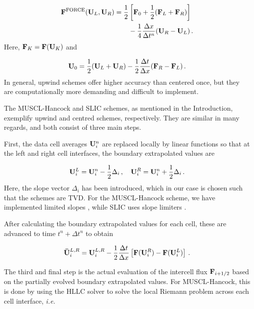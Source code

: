 \documentclass[final,3p,twocolumn]{elsarticle}
\begin{document}
\begin{align} 
    \nonumber 
    {\bf F}^{\rm FORCE}({\bf U}_L,{\bf U}_R) = \frac{1}{2}
    &\left[ {\bf F}_0 + \frac{1}{2} ({\bf F}_L + {\bf F}_{R})
    \right] \\
    \label{eq:FORCE} 
    &- \frac{1}{4} \frac{\Delta x}{\Delta t^n} ({\bf U}_{R} - {\bf
    U}_L) \,.  
\end{align}
%
Here, ${\bf F}_K = {\bf F}({\bf U}_K)$ and 

\begin{equation}
    \label{eq:richtmyer}
    {\bf U}_0 = \frac{1}{2}({\bf U}_L+{\bf U}_R) -
    \frac{1}{2} \frac{\Delta t}{\Delta x}({\bf F}_R - {\bf F}_L) \,.
\end{equation}
%
In general, upwind schemes offer higher accuracy than centered once, but they
are computationally more demanding and difficult to implement. 

The MUSCL-Hancock \cite{van1979towards} and SLIC \cite{toro2000centred}
schemes, as mentioned in the Introduction, exemplify upwind and centred
schemes, respectively. They are similar in many regards, and both consist of
three main steps. 

First, the data cell averages ${\bf U}_i^n$ are replaced
locally by linear functions so that at the left and right cell interfaces, the
boundary extrapolated values are 

\begin{equation}
    \label{eq:BEV}
    {\bf U}_i^L = {\bf U}_i^n-\frac{1}{2}\Delta_i \,,\quad 
    {\bf U}_i^R = {\bf U}_i^n+\frac{1}{2}\Delta_i \,.
\end{equation}
%
Here, the slope vector $\Delta_i$ has been introduced, which in our case is
chosen such that the schemes are TVD. For the MUSCL-Hancock scheme, we have
implemented limited slopes \cite{anderson1986comparison}, while SLIC uses slope
limiters \cite{toro2000centred}. 

After calculating the boundary extrapolated values for each cell, these are
advanced to time $t^n+\Delta t^n$ to obtain

\begin{equation}
    \label{eq:evolution}
    {\bf \bar{U}}_i^{L,R} = {\bf U}_i^{L,R} - \frac{1}{2} \frac{\Delta
    t}{\Delta x} \left[ {\bf F}({\bf U}_i^R)-{\bf F}({\bf U}_i^L) \right] \,.
\end{equation}

The third and final step is the actual evaluation of the intercell flux ${\bf
F}_{i+1/2}$ based on the partially evolved boundary extrapolated values. For
MUSCL-Hancock, this is done by using the HLLC solver to solve the local Riemann
problem across each cell interface, \emph{i.e.~} 
\end{document}
